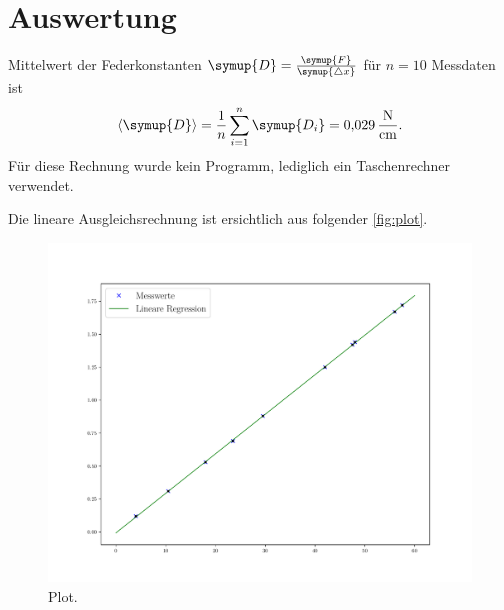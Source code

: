 \section{Auswertung}
\label{sec:Auswertung}
Mittelwert der Federkonstanten $\symup{D} = \frac{\symup{F}}{\symup{\triangle x}}$ für $n = 10$ Messdaten ist 
\begin{equation}
\langle \symup{D} \rangle = \frac{1}{n} \sum_{i=1}^n \symup{D_i} = \SI{0.029}{\newton\per\centi\meter}.
\end{equation}
Für diese Rechnung wurde kein Programm, lediglich ein Taschenrechner verwendet.
  
Die lineare Ausgleichsrechnung ist ersichtlich aus folgender \autoref{fig:plot}.

\begin{figure}
  \centering
  \includegraphics[max width=\linewidth]{Plot.pdf}
  \caption{Plot.}
  \label{fig:plot}
\end{figure}